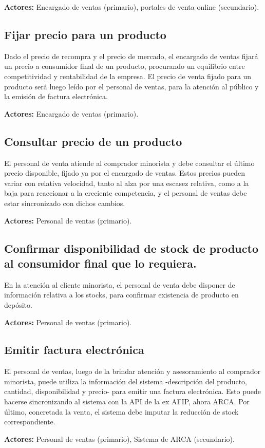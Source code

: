 \textbf{Actores:} Encargado de ventas (primario), portales de venta online (secundario).

\subsection{Fijar precio para un producto}

Dado el precio de recompra y el precio de mercado,
el encargado de ventas fijará un precio a consumidor final de un producto,
procurando un equilibrio entre competitividad y rentabilidad de la empresa.
El precio de venta fijado para un producto será luego leído por el personal de ventas,
para la atención al público y la emisión de factura electrónica.

\textbf{Actores:} Encargado de ventas (primario).

\subsection{Consultar precio de un producto}

El personal de venta atiende al comprador minorista y debe consultar el último precio disponible,
fijado ya por el encargado de ventas.
Estos precios pueden variar con relativa velocidad,
tanto al alza por una escasez relativa,
como a la baja para reaccionar a la creciente competencia,
y el personal de ventas debe estar sincronizado con dichos cambios.

\textbf{Actores:} Personal de ventas (primario).

\subsection{Confirmar disponibilidad de stock de producto al consumidor final que lo requiera.}

En la atención al cliente minorista,
el personal de venta debe disponer de información relativa a los stocks,
para confirmar existencia de producto en depósito.

\textbf{Actores:} Personal de ventas (primario).

\subsection{Emitir factura electrónica}

El personal de ventas, 
luego de la brindar atención y asesoramiento al comprador minorista,
puede utiliza la información del sistema
-descripción del producto, cantidad, disponibilidad y precio-
para emitir una factura electrónica.
Esto puede hacerse sincronizando al sistema con la API de la ex AFIP,
ahora ARCA.
Por último,
concretada la venta,
el sistema debe imputar la reducción de stock correspondiente.

\textbf{Actores:} Personal de ventas (primario), Sistema de ARCA (secundario).
